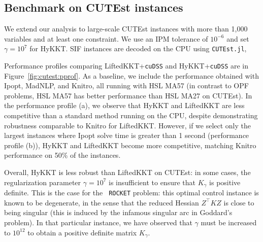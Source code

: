 \subsection{Benchmark on CUTEst instances}
\label{sec:num:cutest}
We extend our analysis to large-scale CUTEst instances with more than 1,000 variables and at least one constraint. We use an IPM tolerance of $10^{-6}$ and set $\gamma = 10^7$ for HyKKT. SIF instances are decoded on the CPU using {\tt CUTEst.jl}, 

Performance profiles comparing LiftedKKT+{\tt cuDSS} and HyKKT+{\tt cuDSS} are
in Figure~\ref{fig:cutest:pprof}. As a baseline, we include the performance
obtained with Ipopt, MadNLP, and Knitro, all running with HSL MA57 (in
contrast to OPF problems, HSL MA57 has better performance than HSL MA27 on CUTEst).
In the performance profile (a), we observe that HyKKT and LiftedKKT are less
competitive than a standard method running on the CPU, despite demonstrating
robustness comparable to Knitro for LiftedKKT. However, if we select only the
largest instances where Ipopt solve time is greater than 1 second
(performance profile (b)), HyKKT and LiftedKKT become more competitive, matching
Knitro performance on 50\% of the instances.

%
Overall, HyKKT is less robust than LiftedKKT on CUTEst: in some cases, the
regularization parameter $\gamma = 10^7$ is insufficient to ensure that
$K_\gamma$ is positive definite. This is the case for the {\tt
ROCKET} problem: this optimal control instance is known to be degenerate, in the sense that
the reduced Hessian $Z^\top K Z$ is close to being singular (this is induced
by the infamous singular arc in Goddard's problem). In that particular instance, we have observed that
$\gamma$ must be increased to $10^{12}$ to obtain a positive definite matrix $K_\gamma$.



